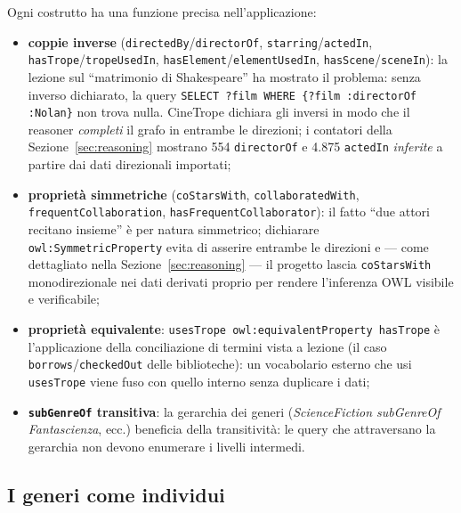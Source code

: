 \documentclass[a4paper,11pt]{article}
\newcommand{\code}[1]{\texttt{#1}}
\begin{document}
Ogni costrutto ha una funzione precisa nell'applicazione:

\begin{itemize}
  \item \textbf{coppie inverse} (\code{directedBy}/\code{directorOf},
        \code{starring}/\code{actedIn}, \code{hasTrope}/\code{tropeUsedIn},
        \code{hasElement}/\code{elementUsedIn},
        \code{hasScene}/\code{sceneIn}): la lezione sul ``matrimonio di
        Shakespeare'' ha mostrato il problema: senza inverso dichiarato, la
        query \code{SELECT ?film WHERE \{?film :directorOf :Nolan\}} non
        trova nulla. CineTrope dichiara gli inversi in modo che il reasoner
        \emph{completi} il grafo in entrambe le direzioni; i contatori della
        Sezione~\ref{sec:reasoning} mostrano 554 \code{directorOf} e 4.875
        \code{actedIn} \emph{inferite} a partire dai dati direzionali
        importati;
  \item \textbf{propriet\`a simmetriche} (\code{coStarsWith},
        \code{collaboratedWith}, \code{frequentCollaboration},
        \code{hasFrequentCollaborator}): il fatto ``due attori recitano
        insieme'' \`e per natura simmetrico; dichiarare
        \code{owl:SymmetricProperty} evita di asserire entrambe le direzioni
        e --- come dettagliato nella Sezione~\ref{sec:reasoning} --- il
        progetto lascia \code{coStarsWith} monodirezionale nei dati derivati
        proprio per rendere l'inferenza OWL visibile e verificabile;
  \item \textbf{propriet\`a equivalente}: \code{usesTrope
        owl:equivalentProperty hasTrope} \`e l'applicazione della
        conciliazione di termini vista a lezione (il caso
        \code{borrows}/\code{checkedOut} delle biblioteche): un vocabolario
        esterno che usi \code{usesTrope} viene fuso con quello interno senza
        duplicare i dati;
  \item \textbf{\code{subGenreOf} transitiva}: la gerarchia dei generi
        (\emph{ScienceFiction subGenreOf Fantascienza}, ecc.) beneficia della
        transitivit\`a: le query che attraversano la gerarchia non devono
        enumerare i livelli intermedi.
\end{itemize}

\subsection{I generi come individui}
\end{document}
